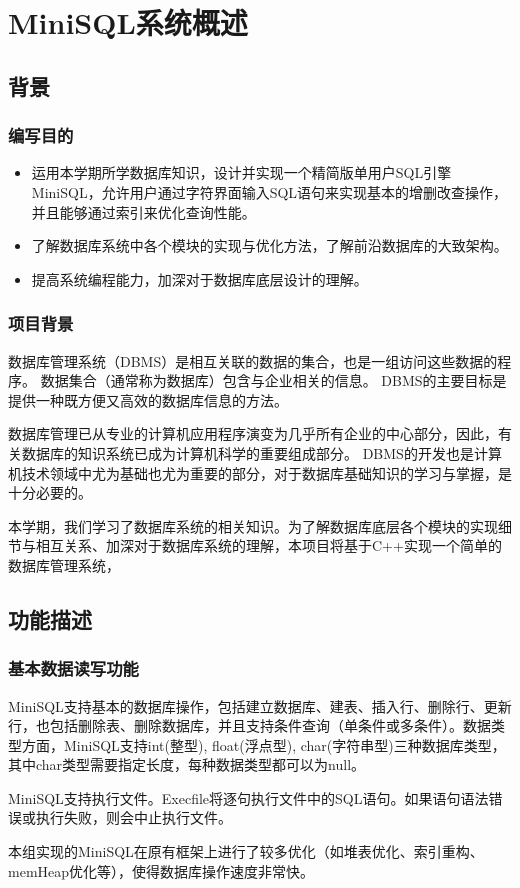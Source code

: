 \documentclass[12pt, a4paper]{article}
\author{\sz{20}{\b{管嘉瑞\ 张峻瑜}}}
\title{\sz{30}{\b{MiniSQL总体设计报告}\vspace{+4ex}}}
\date{\sz{20}{\b{时间：2022年6月4日}}}
\def\s#1{\section{#1}}
\def\ss#1{\subsection{#1}}
\def\sss#1{\subsubsection{#1}}
\def\p{\par}
\begin{document}
\maketitle
\newpage
\tableofcontents

\s{MiniSQL系统概述}
\ss{背景}
\sss{编写目的}
\begin{itemize}
	\item 运用本学期所学数据库知识，设计并实现一个精简版单用户SQL引擎MiniSQL，允许用户通过字符界面输入SQL语句来实现基本的增删改查操作，并且能够通过索引来优化查询性能。
 \item 了解数据库系统中各个模块的实现与优化方法，了解前沿数据库的大致架构。
 \item 提高系统编程能力，加深对于数据库底层设计的理解。
\end{itemize}
\sss{项目背景}
\p 数据库管理系统（DBMS）是相互关联的数据的集合，也是一组访问这些数据的程序。 数据集合（通常称为数据库）包含与企业相关的信息。 DBMS的主要目标是提供一种既方便又高效的数据库信息的方法。
\p 数据库管理已从专业的计算机应用程序演变为几乎所有企业的中心部分，因此，有关数据库的知识系统已成为计算机科学的重要组成部分。 DBMS的开发也是计算机技术领域中尤为基础也尤为重要的部分，对于数据库基础知识的学习与掌握，是十分必要的。
\p 本学期，我们学习了数据库系统的相关知识。为了解数据库底层各个模块的实现细节与相互关系、加深对于数据库系统的理解，本项目将基于C++实现一个简单的数据库管理系统，
\ss{功能描述}


\sss{基本数据读写功能}
\p MiniSQL支持基本的数据库操作，包括建立数据库、建表、插入行、删除行、更新行，也包括删除表、删除数据库，并且支持条件查询（单条件或多条件）。数据类型方面，MiniSQL支持int(整型), float(浮点型), char(字符串型)三种数据库类型，其中char类型需要指定长度，每种数据类型都可以为null。
\p MiniSQL支持执行文件。Execfile将逐句执行文件中的SQL语句。如果语句语法错误或执行失败，则会中止执行文件。
\p 本组实现的MiniSQL在原有框架上进行了较多优化（如堆表优化、索引重构、memHeap优化等），使得数据库操作速度非常快。
\end{document}
